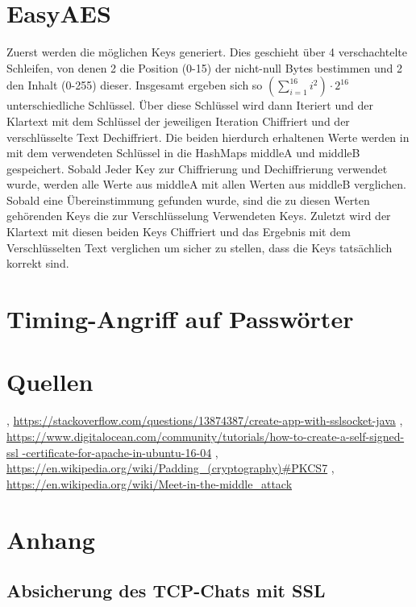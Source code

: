 \documentclass[12pt]{article}
\theoremstyle{plain}
\begin{document}
\section{EasyAES}
Zuerst werden die möglichen Keys generiert. Dies geschieht über 4 verschachtelte Schleifen, von denen 2 die Position (0-15) der nicht-null Bytes bestimmen und 2 den Inhalt (0-255) dieser. Insgesamt ergeben sich so $(\sum_{i=1}^{16} i^2)\cdot 2^{16}$ unterschiedliche Schlüssel. Über diese Schlüssel wird dann Iteriert und der Klartext mit dem Schlüssel der jeweiligen Iteration Chiffriert und der verschlüsselte Text Dechiffriert. Die beiden hierdurch erhaltenen Werte werden in mit dem verwendeten Schlüssel in die HashMaps middleA und middleB gespeichert. Sobald Jeder Key zur Chiffrierung und Dechiffrierung verwendet wurde, werden alle Werte aus middleA mit allen Werten aus middleB verglichen. Sobald eine Übereinstimmung gefunden wurde, sind die zu diesen Werten gehörenden Keys die zur Verschlüsselung Verwendeten Keys. Zuletzt wird der Klartext mit diesen beiden Keys Chiffriert und das Ergebnis mit dem Verschlüsselten Text verglichen um sicher zu stellen, dass die Keys tatsächlich korrekt sind.
\section{Timing-Angriff auf Passwörter}
\section{Quellen}
\begin{thebibliography}{50}
\bibitem [SSLSockets] , \url{https://stackoverflow.com/questions/13874387/create-app-with-sslsocket-java}
, \url{https://www.digitalocean.com/community/tutorials/how-to-create-a-self-signed-ssl
-certificate-for-apache-in-ubuntu-16-04}
\bibitem [Padding] , \url{https://en.wikipedia.org/wiki/Padding_(cryptography)#PKCS7}
 , \url{https://en.wikipedia.org/wiki/Meet-in-the-middle_attack}
\end{thebibliography}
\section{Anhang}
\subsection{Absicherung des TCP-Chats mit SSL}
\end{document}
